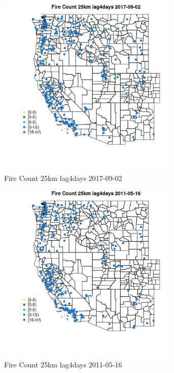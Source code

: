 \begin{figure} 
\centering  
\includegraphics[width=0.77\textwidth]{Code_Outputs/Report_ML_input_PM25_Step4_part_e_de_duplicated_aves_compiled_2019-05-20wNAs_MapObsFire_Count_25km_lag4days2017-09-02.jpg} 
\caption{\label{fig:Report_ML_input_PM25_Step4_part_e_de_duplicated_aves_compiled_2019-05-20wNAsMapObsFire_Count_25km_lag4days2017-09-02}Fire Count 25km lag4days 2017-09-02} 
\end{figure} 
 

\begin{figure} 
\centering  
\includegraphics[width=0.77\textwidth]{Code_Outputs/Report_ML_input_PM25_Step4_part_e_de_duplicated_aves_compiled_2019-05-20wNAs_MapObsFire_Count_25km_lag4days2011-05-16.jpg} 
\caption{\label{fig:Report_ML_input_PM25_Step4_part_e_de_duplicated_aves_compiled_2019-05-20wNAsMapObsFire_Count_25km_lag4days2011-05-16}Fire Count 25km lag4days 2011-05-16} 
\end{figure} 
 

